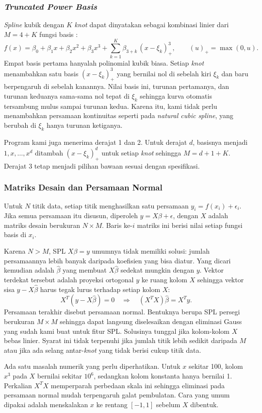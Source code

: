 \subsubsection{\textit{Truncated Power Basis}}

\textit{Spline} kubik dengan $K$ \textit{knot} dapat dinyatakan sebagai kombinasi linier dari $M = 4 + K$ fungsi basis \cite{hastie}:
\[
f(x) = \beta_0 + \beta_1 x + \beta_2 x^2 + \beta_3 x^3 + \sum_{k=1}^{K} \beta_{3+k}\, (x - \xi_k)_+^{3},
\qquad
(u)_+ = \max(0, u) .
\]
Empat basis pertama hanyalah polinomial kubik biasa. Setiap \textit{knot} menambahkan satu basis $(x - \xi_k)_+^3$ yang bernilai nol di sebelah kiri $\xi_k$ dan baru berpengaruh di sebelah kanannya. Nilai basis ini, turunan pertamanya, dan turunan keduanya sama-sama nol tepat di $\xi_k$ sehingga kurva otomatis tersambung mulus sampai turunan kedua. Karena itu, kami tidak perlu menambahkan persamaan kontinuitas seperti pada \textit{natural cubic spline}, yang berubah di $\xi_k$ hanya turunan ketiganya.

Program kami juga menerima derajat 1 dan 2. Untuk derajat $d$, basisnya menjadi $1, x, \dots, x^d$ ditambah $(x - \xi_k)_+^d$ untuk setiap \textit{knot} sehingga $M = d + 1 + K$. Derajat 3 tetap menjadi pilihan bawaan sesuai dengan spesifikasi.

\subsubsection{Matriks Desain dan Persamaan Normal}

Untuk $N$ titik data, setiap titik menghasilkan satu persamaan $y_i = f(x_i) + \epsilon_i$. Jika semua persamaan itu disusun, diperoleh $y = X\beta + \epsilon$, dengan $X$ adalah matriks desain berukuran $N \times M$. Baris ke-$i$ matriks ini berisi nilai setiap fungsi basis di $x_i$.

Karena $N > M$, SPL $X\beta = y$ umumnya tidak memiliki solusi: jumlah persamaannya lebih banyak daripada koefisien yang bisa diatur. Yang dicari kemudian adalah $\hat\beta$ yang membuat $X\hat\beta$ sedekat mungkin dengan $y$. Vektor terdekat tersebut adalah proyeksi ortogonal $y$ ke ruang kolom $X$ sehingga vektor sisa $y - X\hat\beta$ harus tegak lurus terhadap setiap kolom $X$:
\[
X^T(y - X\hat\beta) = 0
\quad\Longrightarrow\quad
(X^TX)\hat\beta = X^Ty .
\]
Persamaan terakhir disebut persamaan normal. Bentuknya berupa SPL persegi berukuran $M \times M$ sehingga dapat langsung diselesaikan dengan eliminasi Gauss yang sudah kami buat untuk fitur SPL. Solusinya tunggal jika kolom-kolom $X$ bebas linier. Syarat ini tidak terpenuhi jika jumlah titik lebih sedikit daripada $M$ atau jika ada selang antar-\textit{knot} yang tidak berisi cukup titik data.

Ada satu masalah numerik yang perlu diperhatikan. Untuk $x$ sekitar 100, kolom $x^3$ pada $X$ bernilai sekitar $10^6$, sedangkan kolom konstanta hanya bernilai 1. Perkalian $X^TX$ memperparah perbedaan skala ini sehingga eliminasi pada persamaan normal mudah terpengaruh galat pembulatan. Cara yang umum dipakai adalah menskalakan $x$ ke rentang $[-1, 1]$ sebelum $X$ dibentuk.
